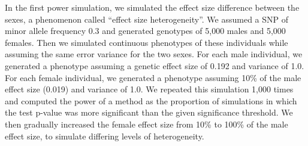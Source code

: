\documentclass[11pt]{article}
\begin{document}
In the first power simulation, 
we simulated the effect size difference between the sexes,
a phenomenon called ``effect size heterogeneity''.
We assumed a SNP of minor allele frequency 0.3 and generated genotypes of 5,000 males and 5,000 females.
Then we simulated continuous phenotypes of these individuals while assuming the same error variance
for the two sexes.
For each male individual, we generated a phenotype assuming a genetic effect size of 0.192 and variance of 1.0.
For each female individual, we generated a phenotype assuming 10\% of the male effect size (0.019) and variance of 1.0.
We repeated this simulation 1,000 times and computed the power of a method as the proportion of simulations
in which the test p-value was 
more significant than the given significance threshold. 
We then gradually increased the female effect size from 10\% to 100\% of the male effect size,
to simulate differing levels of heterogeneity.

\end{document}
